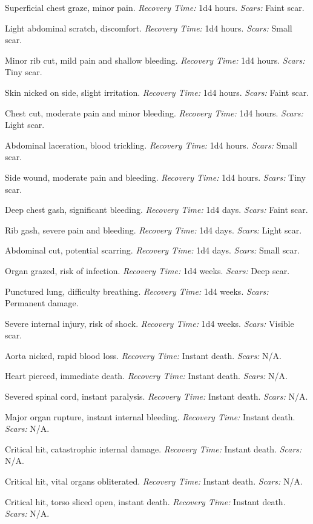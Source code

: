 \documentclass[12pt]{book}
\begin{document}
\begin{description}[labelwidth=1.5em, leftmargin=*, itemsep=0.4em]
    \item[01 -] Superficial chest graze, minor pain. \textit{Recovery Time:} 1d4 hours. \textit{Scars:} Faint scar.
    \item[02 -] Light abdominal scratch, discomfort. \textit{Recovery Time:} 1d4 hours. \textit{Scars:} Small scar.
    \item[03 -] Minor rib cut, mild pain and shallow bleeding. \textit{Recovery Time:} 1d4 hours. \textit{Scars:} Tiny scar.
    \item[04 -] Skin nicked on side, slight irritation. \textit{Recovery Time:} 1d4 hours. \textit{Scars:} Faint scar.
    \item[05 -] Chest cut, moderate pain and minor bleeding. \textit{Recovery Time:} 1d4 hours. \textit{Scars:} Light scar.
    \item[06 -] Abdominal laceration, blood trickling. \textit{Recovery Time:} 1d4 hours. \textit{Scars:} Small scar.
    \item[07 -] Side wound, moderate pain and bleeding. \textit{Recovery Time:} 1d4 hours. \textit{Scars:} Tiny scar.
    \item[08 -] Deep chest gash, significant bleeding. \textit{Recovery Time:} 1d4 days. \textit{Scars:} Faint scar.
    \item[09 -] Rib gash, severe pain and bleeding. \textit{Recovery Time:} 1d4 days. \textit{Scars:} Light scar.
    \item[10 -] Abdominal cut, potential scarring. \textit{Recovery Time:} 1d4 days. \textit{Scars:} Small scar.
    \item[11 -] Organ grazed, risk of infection. \textit{Recovery Time:} 1d4 weeks. \textit{Scars:} Deep scar.
    \item[12 -] Punctured lung, difficulty breathing. \textit{Recovery Time:} 1d4 weeks. \textit{Scars:} Permanent damage.
    \item[13 -] Severe internal injury, risk of shock. \textit{Recovery Time:} 1d4 weeks. \textit{Scars:} Visible scar.
    \item[14 -] Aorta nicked, rapid blood loss. \textit{Recovery Time:} Instant death. \textit{Scars:} N/A.
    \item[15 -] Heart pierced, immediate death. \textit{Recovery Time:} Instant death. \textit{Scars:} N/A.
    \item[16 -] Severed spinal cord, instant paralysis. \textit{Recovery Time:} Instant death. \textit{Scars:} N/A.
    \item[17 -] Major organ rupture, instant internal bleeding. \textit{Recovery Time:} Instant death. \textit{Scars:} N/A.
    \item[18 -] Critical hit, catastrophic internal damage. \textit{Recovery Time:} Instant death. \textit{Scars:} N/A.
    \item[19 -] Critical hit, vital organs obliterated. \textit{Recovery Time:} Instant death. \textit{Scars:} N/A.
    \item[20 -] Critical hit, torso sliced open, instant death. \textit{Recovery Time:} Instant death. \textit{Scars:} N/A.
\end{description}
\end{document}
